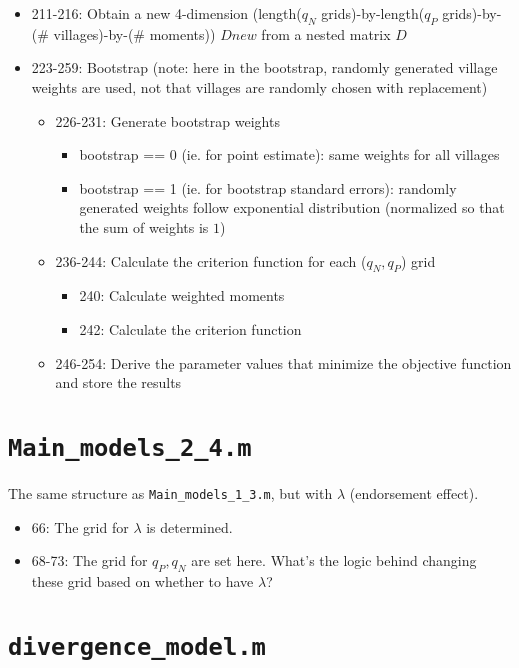 \documentclass[10pt,letterpaper]{article}
\begin{document}
\begin{itemize}
  \item 211-216: Obtain a new 4-dimension (length($q_N$ grids)-by-length($q_P$ grids)-by-(\# villages)-by-(\# moments))   $Dnew$ from a nested matrix $D$
  \item 223-259: Bootstrap (note: here in the bootstrap, randomly generated village weights are used, not that villages are randomly chosen with replacement)
    \begin{itemize}
      \item 226-231: Generate bootstrap weights 
        \begin{itemize}
          \item bootstrap == 0 (ie. for point estimate): same weights for all villages
          \item bootstrap == 1 (ie. for bootstrap standard errors): randomly generated weights follow exponential distribution (normalized so that the sum of weights is $1$)
        \end{itemize}
      \item 236-244: Calculate the criterion function for each ($q_N, q_P$) grid
        \begin{itemize}
          \item 240: Calculate weighted moments 
          \item 242: Calculate the criterion function
        \end{itemize}
      \item 246-254: Derive the parameter values that minimize the objective function and store the results
    \end{itemize}
\end{itemize}

\section{\texttt{Main\_models\_2\_4.m}}\label{main_models_2_4}

The same structure as \texttt{Main\_models\_1\_3.m}, but with $\lambda$ (endorsement effect). 

\begin{itemize}
	\item 66: The grid for $\lambda$ is determined. 
	\item 68-73: The grid for $q_P, q_N$ are set here. What's the logic behind changing these grid based on whether to have $\lambda$?
\end{itemize}

\section{\texttt{divergence\_model.m}}\label{divergence_model}
\end{document}
